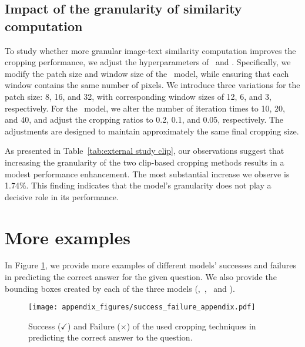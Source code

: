\subsection{Impact of the granularity of similarity computation}


To study whether more granular image-text similarity computation improves the cropping performance, we adjust the hyperparameters of \rac~and \sac. Specifically, we modify the patch size and window size of the \sac~model, while ensuring that each window contains the same number of pixels. We introduce three variations for the patch size: 8, 16, and 32, with corresponding window sizes of 12, 6, and 3, respectively. For the \rac~model, we alter the number of iteration times to 10, 20, and 40, and adjust the cropping ratios to 0.2, 0.1, and 0.05, respectively. The adjustments are designed to maintain approximately the same final cropping size.

As presented in Table~\ref{tab:external study clip}, our observations suggest that increasing the granularity of the two clip-based cropping methods results in a modest performance enhancement. The most substantial increase we observe is 1.74\%. This finding indicates that the model's granularity does not play a decisive role in its performance.





\section{More examples}

In Figure \ref{fig: gradient}, we provide more examples of different models' successes and failures in predicting the correct answer for the given question. We also provide the bounding boxes created by each of the three models (\grad,~\sac,~ and \rac).

\begin{figure}[!h]
    \centering
    \texttt{[image: appendix\_figures/success\_failure\_appendix.pdf]}
    \caption{Success ($\checkmark$) and Failure ($\times$) of the used cropping techniques in predicting the correct answer to the question.}
    \label{fig: gradient}
\end{figure}
